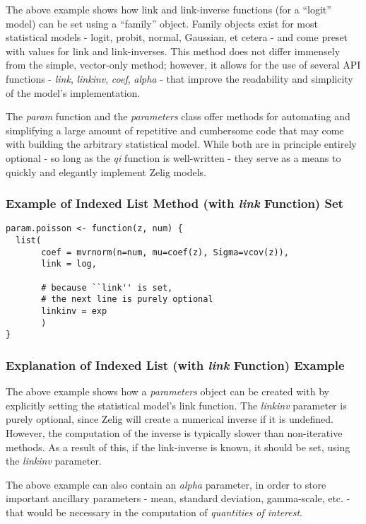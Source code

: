 \documentclass[11pt]{article}
\begin{document}
The above example shows how link and link-inverse functions (for a ``logit'' model) can be set using a ``family'' object.  Family objects exist for most statistical models - logit, probit, normal, Gaussian, et cetera - and come preset with values for link and link-inverses.  This method does not differ immensely from the simple, vector-only method; however, it allows for the use of several API functions - \emph{link}, \emph{linkinv}, \emph{coef}, \emph{alpha} - that improve the readability and simplicity of the model's implementation.

The \emph{param} function and the \emph{parameters} class offer methods for automating and simplifying a large amount of repetitive and cumbersome code that may come with building the arbitrary statistical model.  While both are in principle entirely optional - so long as the \emph{qi} function is well-written - they serve as a means to quickly and elegantly implement Zelig models.


\subsubsection{Example of Indexed List Method (with \emph{link} Function) Set}

\begin{verbatim}
param.poisson <- function(z, num) {
  list(
       coef = mvrnorm(n=num, mu=coef(z), Sigma=vcov(z)),
       link = log,
             
       # because ``link'' is set,
       # the next line is purely optional
       linkinv = exp
       )
}
\end{verbatim}

\subsubsection{Explanation of Indexed List (with \emph{link} Function) Example}

The above example shows how a \emph{parameters} object can be created with by explicitly setting the statistical model's link function.  The \emph{linkinv} parameter is purely optional, since Zelig will create a numerical inverse if it is undefined.  However, the computation of the inverse is typically slower than non-iterative methods.  As a result of this, if the link-inverse is known, it should be set, using the \emph{linkinv} parameter.

The above example can also contain an \emph{alpha} parameter, in order to store important ancillary parameters - mean, standard deviation, gamma-scale, etc. - that would be necessary in the computation of \emph{quantities of interest}.
\end{document}
